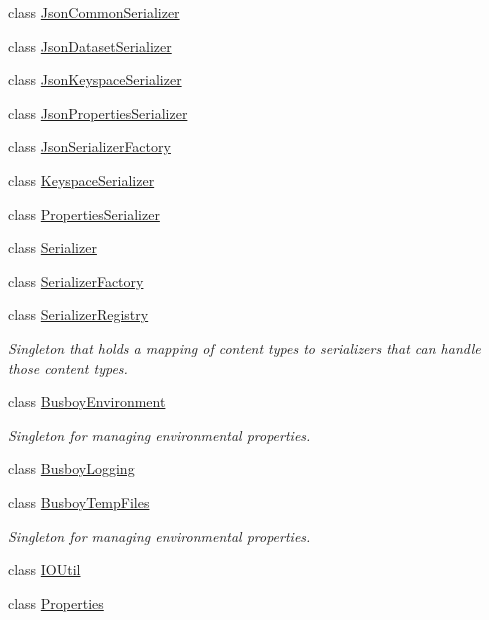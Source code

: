 \begin{DoxyCompactItemize}
\item 
class \hyperlink{classBUSBOY_1_1JsonCommonSerializer}{JsonCommonSerializer}
\item 
class \hyperlink{classBUSBOY_1_1JsonDatasetSerializer}{JsonDatasetSerializer}
\item 
class \hyperlink{classBUSBOY_1_1JsonKeyspaceSerializer}{JsonKeyspaceSerializer}
\item 
class \hyperlink{classBUSBOY_1_1JsonPropertiesSerializer}{JsonPropertiesSerializer}
\item 
class \hyperlink{classBUSBOY_1_1JsonSerializerFactory}{JsonSerializerFactory}
\item 
class \hyperlink{classBUSBOY_1_1KeyspaceSerializer}{KeyspaceSerializer}
\item 
class \hyperlink{classBUSBOY_1_1PropertiesSerializer}{PropertiesSerializer}
\item 
class \hyperlink{classBUSBOY_1_1Serializer}{Serializer}
\item 
class \hyperlink{classBUSBOY_1_1SerializerFactory}{SerializerFactory}
\item 
class \hyperlink{classBUSBOY_1_1SerializerRegistry}{SerializerRegistry}
\begin{DoxyCompactList}\small\item\em Singleton that holds a mapping of content types to serializers that can handle those content types. \item\end{DoxyCompactList}\item 
class \hyperlink{classBUSBOY_1_1BusboyEnvironment}{BusboyEnvironment}
\begin{DoxyCompactList}\small\item\em Singleton for managing environmental properties. \item\end{DoxyCompactList}\item 
class \hyperlink{classBUSBOY_1_1BusboyLogging}{BusboyLogging}
\item 
class \hyperlink{classBUSBOY_1_1BusboyTempFiles}{BusboyTempFiles}
\begin{DoxyCompactList}\small\item\em Singleton for managing environmental properties. \item\end{DoxyCompactList}\item 
class \hyperlink{classBUSBOY_1_1IOUtil}{IOUtil}
\item 
class \hyperlink{classBUSBOY_1_1Properties}{Properties}

\end{DoxyCompactItemize}
